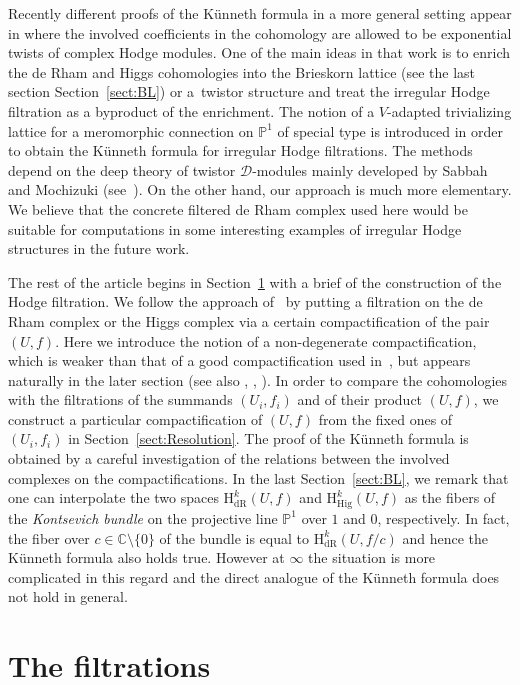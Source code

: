 \documentclass[pdftex]{sigma}
\newcommand{\CC}{\mathbb{C}}
\newcommand{\PP}{\mathbb{P}}
\newcommand{\sD}{\mathscr{D}}
\newcommand{\dR}{\mathrm{dR}}
\newcommand{\Hig}{\mathrm{Hig}}
\newcommand{\coH}{\mathrm{H}}
\newcommand{\cpt}{compactification}
\begin{document}
Recently different proofs of the K\"unneth formula in a more general setting appear in \cite[Theorem~3.39]{S2} where the involved coefficients in the cohomology are allowed to be exponential twists of complex Hodge modules. One of the main ideas in that work is to enrich the de Rham and Higgs cohomologies into the Brieskorn lattice (see the last section Section~\ref{sect:BL}) or a~twistor structure and treat the irregular Hodge filtration as a byproduct of the enrichment. The notion of a $V$-adapted trivializing lattice for a meromorphic connection on $\PP^1$ of special type is introduced \cite[Section~3.2.b]{S2} in order to obtain the K\"unneth formula for irregular Hodge filtrations. The methods depend on the deep theory of twistor $\sD$-modules mainly developed by Sabbah and Mochizuki (see~\cite{M_twistor}). On the other hand, our approach is much more elementary. We believe that the concrete filtered de Rham complex used here would be suitable for computations in some interesting examples of irregular Hodge structures in the future work.

The rest of the article begins in Section~\ref{sect:Fil} with a brief of the construction of the Hodge filtration. We follow the approach of~\cite{Y} by putting a filtration on the de Rham complex or the Higgs complex via a certain {\cpt} of the pair $(U,f)$. Here we introduce the notion of a non-degenerate {\cpt}, which is weaker than that of a good {\cpt} used in~\cite{Y}, but appears naturally in the later section (see also \cite[Section~4]{S}, \cite[Section~7.3]{SY}, \cite{M_GKZ}). In order to compare the cohomologies with the filtrations of the summands $(U_i,f_i)$ and of their product $(U,f)$, we construct a particular {\cpt} of $(U,f)$
from the fixed ones of $(U_i,f_i)$ in Section~\ref{sect:Resolution}. The proof of the K\"unneth formula is obtained by a careful investigation of the relations between the involved complexes on the {\cpt}s. In the last Section~\ref{sect:BL}, we remark that one can interpolate the two spaces $\coH_\dR^k(U,f)$ and $\coH_\Hig^k(U,f)$ as the fibers of the \textit{Kontsevich bundle} on the projective line $\PP^1$ over $1$ and $0$, respectively.
In fact, the fiber over $c\in \CC\setminus \{0\}$ of the bundle is equal to $\coH_\dR^k(U,f/c)$ and hence the K\"unneth formula also holds true. However at $\infty$ the situation is more complicated in this regard and the direct analogue of the K\"unneth formula does not hold in general.

\section{The filtrations}\label{sect:Fil}
\end{document}
